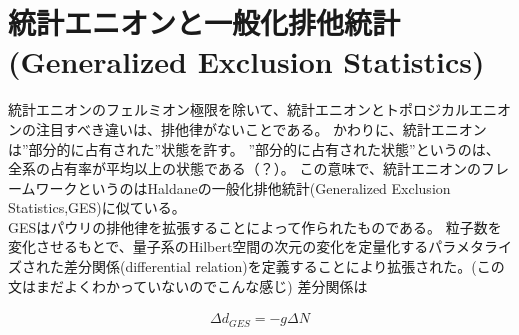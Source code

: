\documentclass[a4paper,11pt]{jsarticle}
\numberwithin{equation}{section}
\begin{document}
\section{統計エニオンと一般化排他統計(Generalized Exclusion Statistics)}
統計エニオンのフェルミオン極限を除いて、統計エニオンとトポロジカルエニオンの注目すべき違いは、排他律がないことである。
かわりに、統計エニオンは”部分的に占有された”状態を許す。
”部分的に占有された状態”というのは、全系の占有率が平均以上の状態である（？）。
この意味で、統計エニオンのフレームワークというのはHaldaneの一般化排他統計(Generalized Exclusion Statistics,GES)に似ている。\\
GESはパウリの排他律を拡張することによって作られたものである。
粒子数を変化させるもとで、量子系のHilbert空間の次元の変化を定量化するパラメタライズされた差分関係(differential relation)を定義することにより拡張された。(この文はまだよくわかっていないのでこんな感じ)
差分関係は

\begin{align}
\Delta  d_{GES}=-g \Delta  N
\end{align}
\end{document}
